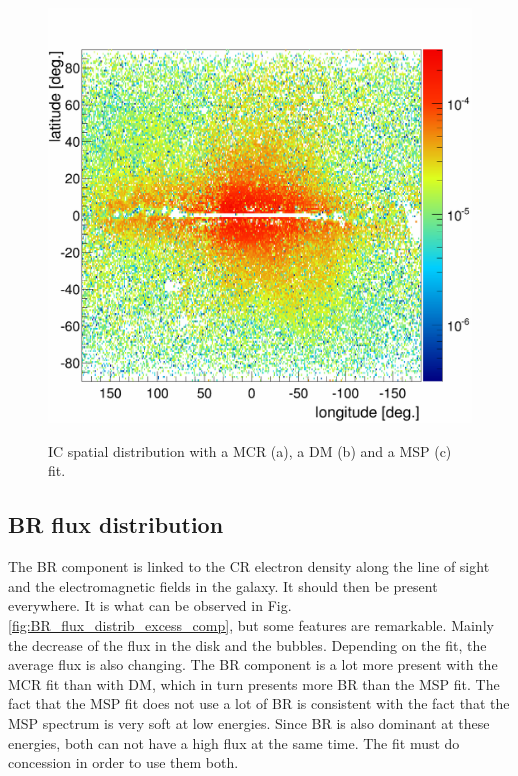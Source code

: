 \begin{figure}[h]
\begin{minipage}[h]{0.45\textwidth}
	  \label{}
  \end{minipage}
  \hfill
  \begin{minipage}[h]{0.45\textwidth}
	  \centering
	  \includegraphics[width=1.\linewidth]{pic/discussion/MSPonly_fine_IC_integral_distribution.png}
	  \label{}
  \end{minipage}
  \caption[IC spatial distributions.]{IC spatial distribution with a MCR (a), a DM (b) and a MSP (c) fit.}
  \label{fig:IC_flux_distrib_excess_comp}	 
\end{figure}

\newpage
\subsection{BR flux distribution}
The BR component is linked to the CR electron density along the line of sight and the electromagnetic fields in the galaxy. It should then be present everywhere. It is what can be observed in Fig. \ref{fig:BR_flux_distrib_excess_comp}, but some features are remarkable. Mainly the decrease of the flux in the disk and the bubbles.
Depending on the fit, the average flux is also changing. The BR component is a lot more present with the MCR fit than with DM, which in turn presents more BR than the MSP fit. The fact that the MSP fit does not use a lot of BR is consistent with the fact that the MSP spectrum is very soft at low energies. Since BR is also dominant at these energies, both can not have a high flux at the same time. The fit must do concession in order to use them both.

